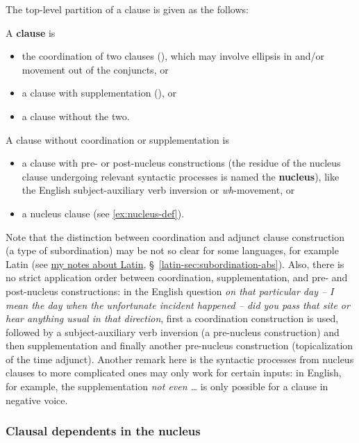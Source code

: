 \documentclass{article}
\newcommand*{\citesec}[1]{\S~{#1}}
\newcommand*{\concept}[1]{\textbf{#1}}
\newcommand*{\term}[1]{\emph{#1}}
\newcommand*{\corpus}[1]{\emph{#1}}
\newcommand{\latin}{\href{../Latin/latin-notes.pdf}{my notes about Latin}}
\begin{document}
The top-level partition of a clause is given as the follows:
\begin{exe}
    \ex\label{ex:clause-def-1} A \concept{clause} is
    \begin{itemize}
        \item the coordination of two clauses (),
        which may involve ellipsis in and/or movement out of the conjuncts, or
        \item a clause with supplementation (), or
        \item a clause without the two.
    \end{itemize}
    \ex\label{ex:clause-def-2} A clause without coordination or supplementation is 
    \begin{itemize}
        \item a clause with pre- or post-nucleus constructions
        (the residue of the nucleus clause undergoing relevant syntactic processes 
        is named the \concept{nucleus}), 
        like the English subject-auxiliary verb inversion or \term{wh}-movement, or 
        \item a nucleus clause (see \eqref{ex:nucleus-def}).
    \end{itemize}
\end{exe}
Note that the distinction between 
coordination and adjunct clause construction (a type of subordination)
may be not so clear for some languages, 
for example Latin (see \latin, \citesec{\ref{latin-sec:subordination-abs}}).
Also, there is no strict application order 
between coordination, supplementation, and pre- and post-nucleus constructions:
in the English question
\corpus{on that particular day -- I mean the day when the unfortunate incident happened -- 
did you pass that site or hear anything usual in that direction},
first a coordination construction is used, 
followed by a subject-auxiliary verb inversion (a pre-nucleus construction)
and then supplementation 
and finally another pre-nucleus construction (topicalization of the time adjunct).
Another remark here is the syntactic processes from nucleus clauses to more complicated ones 
may only work for certain inputs:
in English, for example, the supplementation \corpus{not even \dots} 
is only possible for a clause in negative voice.

\subsubsection{Clausal dependents in the nucleus}
\end{document}
